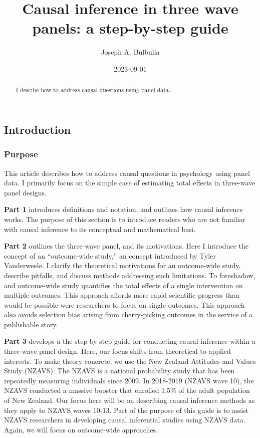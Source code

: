 \documentclass[
  singlecolumn]{article}
\title{Causal inference in three wave panels: a step-by-step guide}
\author{Joseph A. Bulbulia}
\affil{%
                  Victoria University of Wellington, New Zealand, School
                  of Psychology, Centre for Applied Cross-Cultural
                  Research
              }
\date{2023-09-01}
\begin{document}
\maketitle
\begin{abstract}
I descibe how to address causal questions using panel data\ldots{}
\end{abstract}
\subsection{Introduction}\label{introduction}

\subsubsection{Purpose}\label{purpose}

This article describes how to address causal questions in psychology
using panel data. I primarily focus on the simple case of estimating
total effects in three-wave panel designs.

\textbf{Part 1} introduces definitions and notation, and outlines how
causal inference works. The purpose of this section is to introduce
readers who are not familiar with causal inference to its conceptual and
mathematical basi.

\textbf{Part 2} outlines the three-wave panel, and its motivations. Here
I introduce the concept of an ``outcome-wide study,'' an concept
introduced by Tyler Vanderweele. I clarify the theoretical motivations
for an outcome-wide study, describe pitfalls, and discuss methods
addressing such limitations. To foreshadow, and outcome-wide study
quantifies the total effects of a single intervention on multiple
outcomes. This approach affords more rapid scientific progress than
would be possible were researchers to focus on single outcomes. This
approach also avoids selection bias arising from cherry-picking outcomes
in the service of a publishable story.

\textbf{Part 3} develops a the step-by-step guide for conducting causal
inference within a three-wave panel design. Here, our focus shifts from
theoretical to applied interests. To make theory concrete, we use the
New Zealand Attitudes and Values Study (NZAVS). The NZAVS is a national
probability study that has been repeatedly measuring individuals since
2009. In 2018-2019 (NZAVS wave 10), the NZAVS conducted a massive
booster that enrolled 1.5\% of the adult population of New Zealand. Our
focus here will be on describing causal inference methods as they apply
to NZAVS waves 10-13. Part of the purpose of this guide is to assist
NZAVS researchers in developing causal inferential studies using NZAVS
data. Again, we will focus on outcome-wide approaches.
\end{document}
